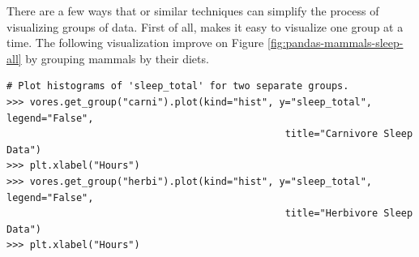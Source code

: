 There are a few ways that  or similar techniques can simplify the process of visualizing groups of data.
First of all,  makes it easy to visualize one group at a time.
The following visualization improve on Figure \ref{fig:pandas-mammals-sleep-all} by grouping mammals by their diets.

\begin{lstlisting}
# Plot histograms of 'sleep_total' for two separate groups.
>>> vores.get_group("carni").plot(kind="hist", y="sleep_total", legend="False",
                                                title="Carnivore Sleep Data")
>>> plt.xlabel("Hours")
>>> vores.get_group("herbi").plot(kind="hist", y="sleep_total", legend="False",
                                                title="Herbivore Sleep Data")
>>> plt.xlabel("Hours")
\end{lstlisting}

